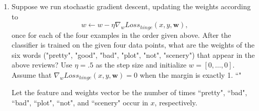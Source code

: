 \documentclass[10pt]{article}
\begin{document}
\begin{enumerate}[label=(\alph*)]

  \item Suppose we run stochastic gradient descent, updating the weights according to
$$w \leftarrow w - \eta \nabla_w Loss_{hinge} (x, y, \mathbf{w}),$$
once for each of the four examples in the order given above. After the classifier is trained on the given four data points, what are the weights of the six words ("pretty", "good", "bad", "plot", "not", "scenery") that appear in the above reviews? Use $\eta =.5$ as the step size and initialize $w = [0, \dots, 0]$. Assume that $\nabla_w Loss_{hinge} (x, y, \mathbf{w})=0$ when the margin is exactly 1. ``"

Let the feature and weights vector be the number of times ``pretty", ``bad", ``bad", ``plot", ``not", and ``scenery" occur in $x$, respectively.
  

\end{enumerate}
\end{document}
